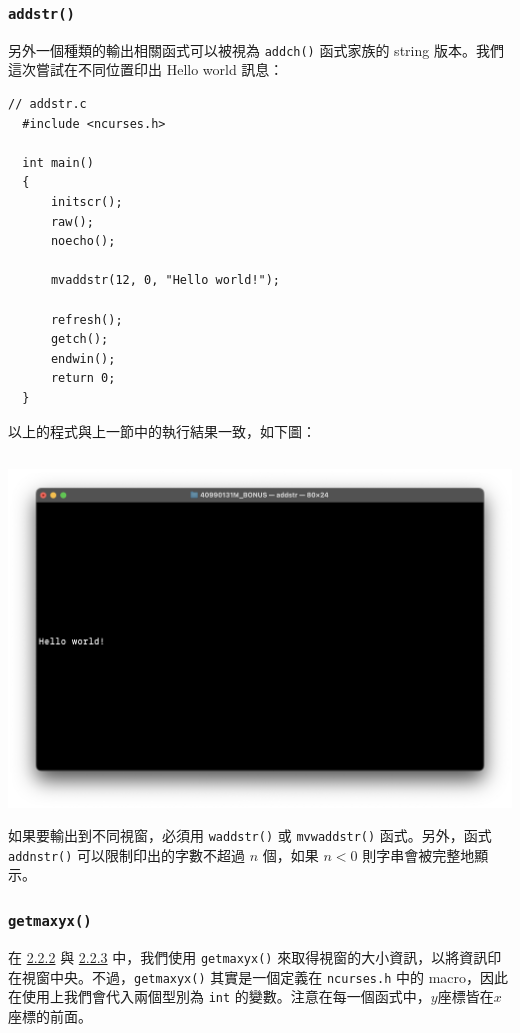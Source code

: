 \documentclass[12pt]{article}
\theoremstyle{definition}
\begin{document}
\subsubsection{\texttt{addstr()}}
\noindent
\hypertarget{2.2.3}{另外一個種類的輸出相關函式}可以被視為 \texttt{addch()} 函式家族的 string 版本。我們這次嘗試在不同位置印出 Hello world 訊息：
\begin{lstlisting}[style=C]
  // addstr.c
  #include <ncurses.h>

  int main()
  {
      initscr();
      raw();
      noecho();
    
      mvaddstr(12, 0, "Hello world!");
    
      refresh();
      getch();
      endwin();
      return 0;
  }
\end{lstlisting}
以上的程式與上一節中的執行結果一致，如下圖：
\begin{lstlisting}[style=zsh]
  % ./addstr
\end{lstlisting}
\begin{center}
    \includegraphics[width=\linewidth]{addstr.png}
\end{center}
如果要輸出到不同視窗，必須用 \texttt{waddstr()} 或 \texttt{mvwaddstr()} 函式。另外，函式 \texttt{addnstr()} 可以限制印出的字數不超過 $n$ 個，如果 $n<0$ 則字串會被完整地顯示。

\subsubsection{\texttt{getmaxyx()}}
\noindent
在 \hyperlink{2.2.2}{2.2.2} 與 \hyperlink{2.2.3}{2.2.3} 中，我們使用 \texttt{getmaxyx()} 來取得視窗的大小資訊，以將資訊印在視窗中央。不過，\texttt{getmaxyx()} 其實是一個定義在 \texttt{ncurses.h} 中的 macro，因此在使用上我們會代入兩個型別為 \texttt{int} 的變數。注意在每一個函式中，$y$座標皆在$x$座標的前面。
\end{document}
